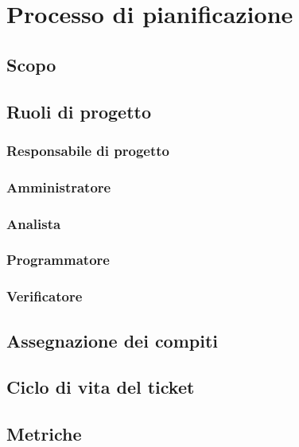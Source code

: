 \section{Processo di pianificazione}\label{4.2}

\subsection{Scopo}\label{4.2.1}

\subsection{Ruoli di progetto}\label{4.2.2}

\subsubsection{Responsabile di progetto}\label{4.2.2.1}

\subsubsection{Amministratore}\label{4.2.2.2}

\subsubsection{Analista}\label{4.2.2.3}

\subsubsection{Programmatore}\label{4.2.2.4}

\subsubsection{Verificatore}\label{4.2.2.5}

\subsection{Assegnazione dei compiti}\label{4.2.3}

\subsection{Ciclo di vita del ticket}\label{4.2.4}

\subsection{Metriche}\label{4.2.5}

